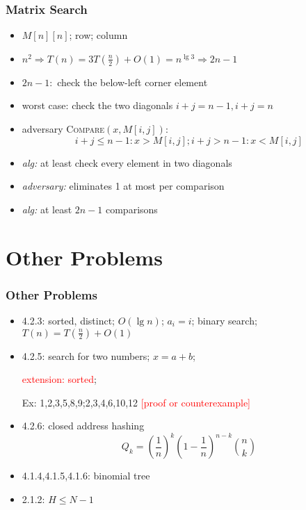 \documentclass{beamer}
\begin{document}
\begin{frame}
  \frametitle{Matrix Search}
  
  \begin{example}
    \begin{itemize}
      \item $M[n][n]$; row; column
      \item $n^2 \Rightarrow T(n) = 3T(\frac{n}{2}) + O(1) = n^{\lg 3}
      \Rightarrow 2n-1$
      \item $2n-1:$ check the below-left corner element
      \item worst case: check the two diagonals $i+j=n-1,i+j=n$
      \item adversary \textsc{Compare$(x, M[i,j])$}:
      \[
        i + j \leq n-1 : x > M[i,j]; i + j > n-1 : x < M[i,j]
      \] 
      \item \emph{alg:} at least check every element in two diagonals 
      \item \emph{adversary:} eliminates 1 at most per comparison
      \item \emph{alg:} at least $2n-1$ comparisons 
    \end{itemize}
  \end{example}
\end{frame}

\section{Other Problems}

\begin{frame}
  \frametitle{Other Problems}
  
  \begin{itemize}
    \setlength{\itemsep}{5pt}
    \item 4.2.3: sorted, distinct; $O(\lg n)$; $a_i = i$; binary search; $T(n)
    = T(\frac{n}{2}) + O(1)$
    \item 4.2.5: search for two numbers; $x = a+b$; 
    
    \textcolor{red}{extension: sorted}; 
    
    Ex: 1,2,3,5,8,9;2,3,4,6,10,12 \textcolor{red}{[proof or counterexample]}
    \item 4.2.6: closed address hashing
    	\[
    	  Q_k = (\frac{1}{n})^k (1-\frac{1}{n})^{n-k} \binom{n}{k}
    	\]
    \item 4.1.4,4.1.5,4.1.6: binomial tree
    \item 2.1.2: $H \leq N -1$
  \end{itemize}
\end{frame}
%   
\end{document}
